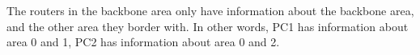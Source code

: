 The routers in the backbone area only have information about the backbone area, and the other area they border with. In other words, PC1 has information about area 0 and 1, PC2 has information about area 0 and 2.